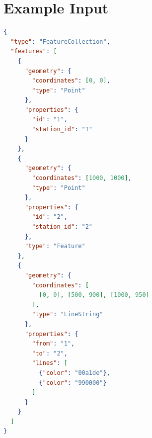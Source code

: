 \documentclass[10pt,a4paper]{article}
\begin{document}
\section{Example Input}
\label{exampleinput}


\begin{lstlisting}[language=json,firstnumber=1]
{
  "type": "FeatureCollection",
  "features": [
    {
      "geometry": {
        "coordinates": [0, 0],
        "type": "Point"
      },
      "properties": {
        "id": "1",
        "station_id": "1"
      }
    },
    {
      "geometry": {
        "coordinates": [1000, 1000],
        "type": "Point"
      },
      "properties": {
        "id": "2",
        "station_id": "2"
      },
      "type": "Feature"
    },
    {
      "geometry": {
        "coordinates": [
          [0, 0], [500, 900], [1000, 950]
        ],
        "type": "LineString"
      },
      "properties": {
        "from": "1",
        "to": "2",
        "lines": [
          {"color": "00a1de"},
          {"color": "990000"}
        ]
      }
    }
  ]
}
\end{lstlisting}
\end{document}

